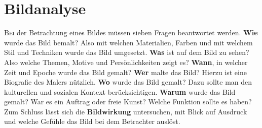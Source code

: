 \section{Bildanalyse}
\lettrine{B}{ei} der Betrachtung eines Bildes müssen sieben Fragen beantwortet werden. \textbf{Wie} wurde das Bild bemalt?
Also mit
welchen Materialien, Farben und mit welchem Stil und Techniken wurde das Bild umgesetzt.
\textbf{Was} ist auf dem Bild zu sehen? Also welche Themen, Motive und Persönlichkeiten zeigt es? \textbf{Wann}, in welcher
Zeit und Epoche wurde das Bild gemalt? \textbf{Wer} malte das Bild? Hierzu ist eine Biografie des Malers nützlich.
\textbf{Wo} wurde das Bild gemalt? Dazu sollte man den kulturellen und sozialen Kontext berücksichtigen. \textbf{Warum}
wurde das Bild gemalt? War es ein Auftrag oder freie Kunst? Welche Funktion sollte es haben? Zum Schluss lässt sich die
\textbf{Bildwirkung} untersuchen, mit Blick auf Ausdruck und welche Gefühle das Bild bei dem Betrachter auslöst.
